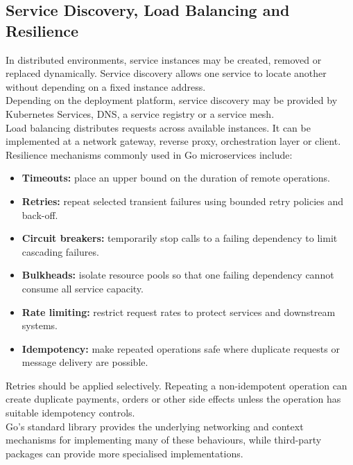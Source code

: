 \subsection{Service Discovery, Load Balancing and Resilience}

In distributed environments, service instances may be created, removed or replaced dynamically. Service discovery allows one service to locate another without depending on a fixed instance address.\\

Depending on the deployment platform, service discovery may be provided by Kubernetes Services, DNS, a service registry or a service mesh.\\

Load balancing distributes requests across available instances. It can be implemented at a network gateway, reverse proxy, orchestration layer or client.\\

Resilience mechanisms commonly used in Go microservices include:

\begin{itemize}
    \item \textbf{Timeouts:} place an upper bound on the duration of remote operations.
    \item \textbf{Retries:} repeat selected transient failures using bounded retry policies and back-off.
    \item \textbf{Circuit breakers:} temporarily stop calls to a failing dependency to limit cascading failures.
    \item \textbf{Bulkheads:} isolate resource pools so that one failing dependency cannot consume all service capacity.
    \item \textbf{Rate limiting:} restrict request rates to protect services and downstream systems.
    \item \textbf{Idempotency:} make repeated operations safe where duplicate requests or message delivery are possible.
\end{itemize}

Retries should be applied selectively. Repeating a non-idempotent operation can create duplicate payments, orders or other side effects unless the operation has suitable idempotency controls.\\

Go's standard library provides the underlying networking and context mechanisms for implementing many of these behaviours, while third-party packages can provide more specialised implementations.

